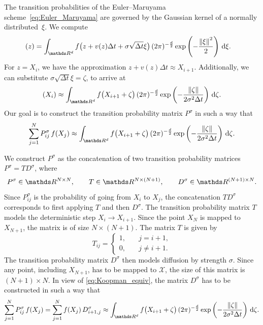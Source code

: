 The transition probabilities of the Euler--Maruyama scheme~\eqref{eq:Euler_Maruyama} are governed by the Gaussian kernel of a normally distributed~$\xi$. We compute
\begin{align}
    [U f](z) & = \int_{\R^d} f\big(z + v(z) \Delta t + \sigma \sqrt{\Delta t} \xi\big)  \, (2\pi)^{-\frac{d}{2}} \exp\left(-\frac{\norm{\xi}^2}{2}\right) \, \dd \xi.
\end{align}
For $z=X_i$, we have the approximation $z + v(z) \Delta t \approx X_{i+1}$. Additionally, we can substitute $\sigma \sqrt{\Delta t}\xi = \zeta$, to arrive at
\begin{equation*}
    [U f](X_i) \approx\int_{\R^d} f\big( X_{i+1} + \zeta\big)\, (2\pi)^{-\frac{d}{2}}\exp\left(-\frac{\norm{\zeta}}{2\sigma^2 \Delta t}\right) \, \dd \zeta.
\end{equation*}
Our goal is to construct the transition probability matrix $P^\sigma$ in such a way that
\begin{equation}\label{eq:Koopman_equiv}
    \sum_{j=1}^N P_{ij}^\sigma \, f(X_j)  \approx \int_{\R^d} f\big( X_{i+1} + \zeta\big)\, (2\pi)^{-\frac{d}{2}}\exp\left(-\frac{\norm{\zeta}}{2\sigma^2 \Delta t}\right) \, \dd \zeta.
\end{equation}

We construct $P^\sigma$ as the concatenation of two transition probability matrices $P^\sigma = T D^\sigma$, where
\begin{equation}
    P^\sigma \in \R^{N\times N}, \qquad T\in \R^{N \times (N+1)}, \qquad D^\sigma \in \R^{(N+1)\times N}.
\end{equation}
Since $P_{ij}^\sigma$ is the probability of going from $X_i$ to $X_j$, the concatenation $TD^\sigma$ corresponds to first applying $T$ and then $D^\sigma$. The transition probability matrix $T$ models the deterministic step $X_i \to X_{i+1}$. Since the point $X_N$ is mapped to $X_{N+1}$, the matrix is of size $N\times (N+1)$. The matrix $T$ is given by
\begin{equation}
    T_{ij} = \begin{cases}
        1, \quad & j=i+1,      \\
        0, \quad & j \neq i+1.
    \end{cases}
\end{equation}
The transition probability matrix $D^\sigma$ then models diffusion by strength $\sigma$. Since any point, including $X_{N+1}$, has to be mapped to $\mathcal{X}$, the size of this matrix is $(N+1)\times N$. In view of \cref{eq:Koopman_equiv}, the matrix $D^\sigma$ has to be constructed in such a way that
\begin{equation}\label{eq:Koopman_equiv_final}
    \sum_{j=1}^N P_{ij}^\sigma \, f(X_j)  = \sum_{j=1}^N f(X_j) \, D^\sigma_{i+1, j} \approx \int_{\R^d} f\big( X_{i+1} + \zeta\big)\, (2\pi)^{-\frac{d}{2}}\exp\left(-\frac{\norm{\zeta}}{2\sigma^2 \Delta t}\right) \, \dd \zeta.
\end{equation}

